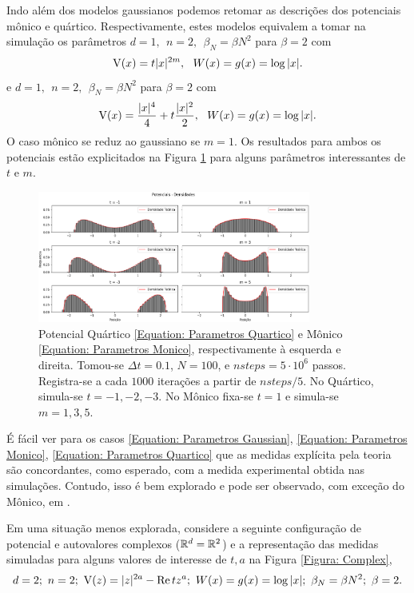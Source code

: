 \documentclass[12pt]{report}
\begin{document}
Indo além dos modelos gaussianos podemos retomar as descrições dos potenciais mônico e quártico. Respectivamente, estes modelos equivalem a tomar na simulação os parâmetros $d = 1, \ \  n = 2, \ \ \beta_N = \beta N^2$ para $\beta = 2$ com
\begin{equation}
	\operatorname{V}(x)= t |x|^{2m}, \ \ W(x) = g(x) = \log{|x|}.
	\label{Equation: Parametros Monico}
\end{equation}
e $d = 1, \ \  n = 2, \ \ \beta_N = \beta N^2$ para $\beta = 2$ com
\begin{equation}
	\operatorname{V}(x)=\frac{|x|^4}{4} + t \frac{|x|^2}{2}, \ \ W(x) = g(x) = \log{|x|}.
	\label{Equation: Parametros Quartico}
\end{equation}
O caso mônico se reduz ao gaussiano se $m=1$. Os resultados para ambos os potenciais estão explicitados na Figura \ref{Figura: Quartic Monic} para alguns parâmetros interessantes de $t$ e $m$.
\begin{figure}[ht!]
	\centering
	\includegraphics[width=0.8\textwidth]{Assets/validationQuarticMonic-alt.png}
	\caption{Potencial Quártico \ref{Equation: Parametros Quartico} e Mônico \ref{Equation: Parametros Monico}, respectivamente à esquerda e direita. Tomou-se $\Delta t = 0.1$, $N=100$, e $nsteps = 5\cdot10^6$ passos. Registra-se a cada $1000$ iterações a partir de $nsteps/5$. No Quártico, simula-se $t=-1,-2,-3$. No Mônico fixa-se $t=1$ e simula-se $m=1,3,5$.}
	\label{Figura: Quartic Monic}
\end{figure}

É fácil ver para os casos \ref{Equation: Parametros Gaussian}, \ref{Equation: Parametros Monico}, \ref{Equation: Parametros Quartico} que as medidas explícita pela teoria são concordantes, como esperado, com a medida experimental obtida nas simulações. Contudo, isso é bem explorado e pode ser observado, com exceção do Mônico, em \cite{Chafa2018}.

 Em uma situação menos explorada, considere a seguinte configuração de potencial e autovalores complexos ($\mathbb{R}^d = \mathbb{R}^2$) e a representação das medidas simuladas para alguns valores de interesse de $t, a$ na Figura \ref{Figura: Complex},
\begin{equation}
	d = 2; \  n = 2; \  \operatorname{V}(z)=|z|^{2a} - \mathop{\rm Re}{t z^a};  \ W(x) = g(x) = \log{|x|};  \ \beta_N = \beta N^2;  \ \beta = 2.
	\label{Equation: Complex}
\end{equation}
\end{document}
